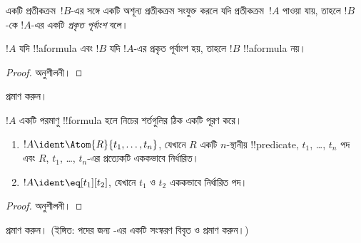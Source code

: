 \documentclass[../../../include/open-logic-section]{subfiles}
\begin{document}
\begin{defn}[প্রকৃত পূর্বাংশ]
একটি প্রতীকক্রম~$!B$-এর সঙ্গে একটি অশূন্য প্রতীকক্রম সংযুক্ত করলে যদি
প্রতীকক্রম~$!A$ পাওয়া যায়, তাহলে $!B$-কে $!A$-এর একটি
\emph{প্রকৃত পূর্বাংশ} বলে।
\end{defn}

\begin{lem}
$!A$ যদি !!a{formula} এবং $!B$ যদি $!A$-এর প্রকৃত পূর্বাংশ হয়,
তাহলে $!B$ !!a{formula} নয়।
\end{lem}

\begin{proof}
অনুশীলনী।
\end{proof}

\begin{prob}
 প্রমাণ করুন।
\end{prob}

\begin{prop}
$!A$ একটি পরমাণু !!{formula} হলে নিচের শর্তগুলির ঠিক একটি পূরণ করে।
\begin{enumerate}
\item $!A \ident \Atom{R}{t_1,\dots,t_n}$, যেখানে $R$ একটি
  $n$-স্থানীয় !!{predicate}, $t_1$, \dots, $t_n$ পদ এবং $R$,
  $t_1$, \dots, $t_n$-এর প্রত্যেকটি এককভাবে নির্ধারিত।
\item $!A \ident \eq[t_1][t_2]$, যেখানে $t_1$ ও $t_2$ এককভাবে
  নির্ধারিত পদ।
\end{enumerate}
\end{prop}

\begin{proof}
অনুশীলনী।
\end{proof}

\begin{prob}
 প্রমাণ করুন। (ইঙ্গিত:
পদের জন্য -এর একটি সংস্করণ বিবৃত
ও প্রমাণ করুন।)
\end{prob}
\end{document}

